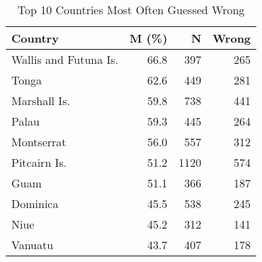 \begin{table}[htbp]
\centering
\caption{Top 10 Countries Most Often Guessed Wrong}
\label{tab:wrong-guesses}
\begin{tabular}{lrrr}
\toprule
Country & M (\%) & N & Wrong \\
\midrule
Wallis and Futuna Is. & 66.8 & 397 & 265 \\
Tonga & 62.6 & 449 & 281 \\
Marshall Is. & 59.8 & 738 & 441 \\
Palau & 59.3 & 445 & 264 \\
Montserrat & 56.0 & 557 & 312 \\
Pitcairn Is. & 51.2 & 1120 & 574 \\
Guam & 51.1 & 366 & 187 \\
Dominica & 45.5 & 538 & 245 \\
Niue & 45.2 & 312 & 141 \\
Vanuatu & 43.7 & 407 & 178 \\
\bottomrule
\end{tabular}
\end{table}